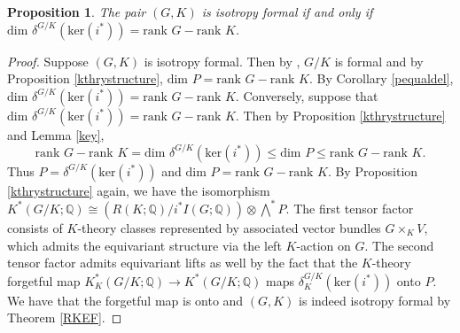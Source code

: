 \documentclass[11pt]{amsart}
\theoremstyle{plain}
\newtheorem{theorem}{Theorem}[section]
\newtheorem{proposition}[theorem]{Proposition}
\theoremstyle{definition}
\begin{document}
	\begin{proposition}\label{rankSam}
		The pair $(G, K)$ is isotropy formal if and only if $\text{dim }\delta^{G/K}(\text{ker}(i^*))=\text{rank }G-\text{rank }K$.
	\end{proposition}
	\begin{proof}Suppose $(G, K)$ is isotropy formal. Then by \cite[Theorem A]{CFok}, $G/K$ is formal and by Proposition \ref{kthrystructure}, $\text{dim }P=\text{rank }G-\text{rank }K$. By Corollary \ref{pequaldel}, $\text{dim }\delta^{G/K}(\text{ker}(i^*))=\text{rank }G-\text{rank }K$. Conversely, suppose that $\text{dim }\delta^{G/K}(\text{ker}(i^*))=\text{rank }G-\text{rank }K$. Then by Proposition \ref{kthrystructure} and Lemma \ref{key}, 
	\[\text{rank }G-\text{rank }K=\text{dim }\delta^{G/K}(\text{ker}(i^*))\leq \text{dim }P\leq \text{rank }G-\text{rank }K.\]
	Thus $P=\delta^{G/K}(\text{ker}(i^*))$ and $\text{dim }P=\text{rank }G-\text{rank }K$. By Proposition \ref{kthrystructure} again, we have the isomorphism $K^*(G/K; \mathbb{Q})\cong \left(R(K; \mathbb{Q})/i^*I(G; \mathbb{Q})\right)\otimes\bigwedge\nolimits^*P$. The first tensor factor consists of $K$-theory classes represented by associated vector bundles $G\times_K V$, which admits the equivariant structure via the left $K$-action on $G$. The second tensor factor admits equivariant lifts as well by the fact that the $K$-theory forgetful map $K^*_K(G/K; \mathbb{Q})\to K^*(G/K; \mathbb{Q})$ maps $\delta^{G/K}_K(\text{ker}(i^*))$ onto $P$. We have that the forgetful map is onto and $(G, K)$ is indeed isotropy formal by Theorem \ref{RKEF}. 
	\end{proof}
\end{document}
